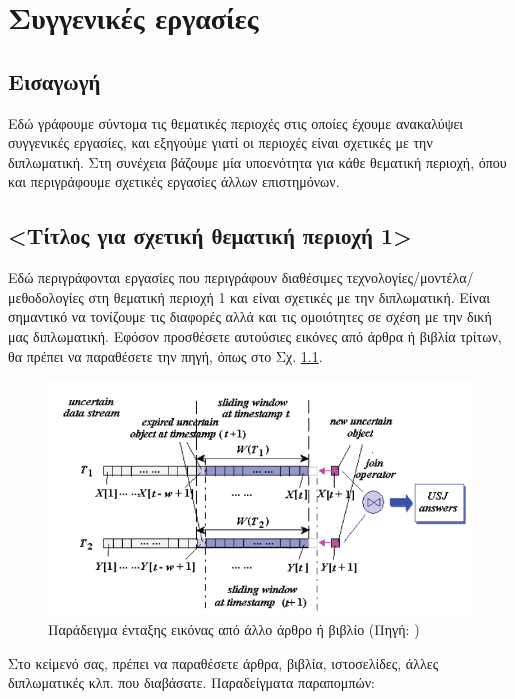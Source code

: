 \chapter{Συγγενικές εργασίες}
\label{chap2}

\section{Εισαγωγή}

Εδώ γράφουμε σύντομα τις θεματικές περιοχές στις οποίες έχουμε ανακαλύψει συγγενικές εργασίες, και εξηγούμε γιατί οι περιοχές είναι σχετικές με την διπλωματική. Στη συνέχεια βάζουμε μία υποενότητα για κάθε θεματική περιοχή, όπου και περιγράφουμε σχετικές εργασίες άλλων επιστημόνων.

\section{<Τίτλος για σχετική θεματική περιοχή 1>}

Εδώ περιγράφονται εργασίες που περιγράφουν διαθέσιμες τεχνολογίες/μοντέλα/μεθοδολογίες  στη θεματική περιοχή 1 και είναι σχετικές με την διπλωματική.
Είναι σημαντικό να τονίζουμε τις διαφορές αλλά και τις ομοιότητες σε σχέση με την δική μας διπλωματική. Εφόσον προσθέσετε αυτούσιες εικόνες από άρθρα ή βιβλία τρίτων, θα πρέπει να παραθέσετε την πηγή, όπως στο Σχ. \ref{dataconnection}.

\begin{figure}[t!]
	\includegraphics[scale=0.8]{figures/dataconnection.png}
	\centering
	\caption{Παράδειγμα ένταξης εικόνας από άλλο άρθρο ή βιβλίο (Πηγή: \cite{[ACC+03]})}
	\label{dataconnection}
\end{figure}

Στο κείμενό σας, πρέπει να παραθέσετε άρθρα, βιβλία, ιστοσελίδες, άλλες διπλωματικές κλπ. που διαβάσατε. Παραδείγματα παραπομπών:

